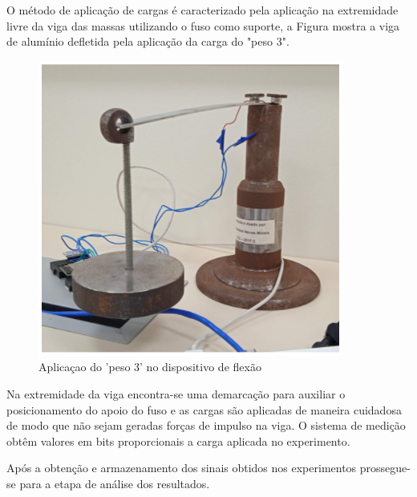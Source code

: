 O método de aplicação de cargas é caracterizado pela aplicação na extremidade livre da viga das massas utilizando o fuso como suporte, a Figura mostra a viga de alumínio defletida pela aplicação da carga do "peso 3".

\begin{figure}[htb]
	\caption{\label{fig:2080} Aplicaçao do 'peso 3' no dispositivo de flexão}
	\begin{center}
		\includegraphics[width=\textwidth]{pictures/2080.png}
	\end{center}
\end{figure}

Na extremidade da viga encontra-se uma demarcação para auxiliar o posicionamento do apoio do fuso e as cargas são aplicadas de maneira cuidadosa de modo que não sejam geradas forças de impulso na viga.
O sistema de medição obtêm valores em bits proporcionais a carga aplicada no experimento.

Após a obtenção e armazenamento dos sinais obtidos nos experimentos prossegue-se para a etapa de análise dos resultados.

